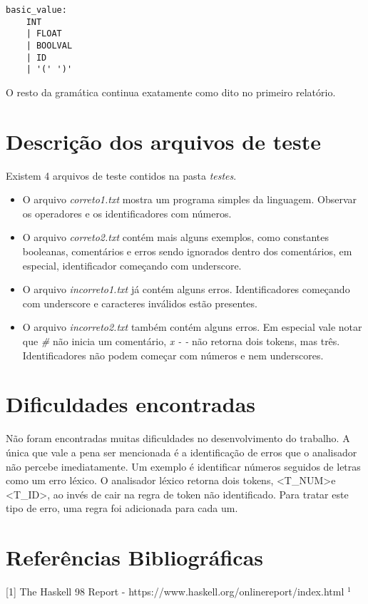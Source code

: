 \documentclass[11pt]{article}
\begin{document}
\begin{lstlisting}[basicstyle=\small]
basic_value: 
    INT
    | FLOAT
    | BOOLVAL
    | ID
    | '(' ')'
\end{lstlisting}

O resto da gramática continua exatamente como dito no primeiro relatório.

\section{Descrição dos arquivos de teste}

Existem 4 arquivos de teste contidos na pasta \emph{testes}.
\begin{itemize}
    \item O arquivo \emph{correto1.txt} mostra um programa simples da linguagem. Observar os operadores e os identificadores com números.
    \item O arquivo \emph{correto2.txt} contém mais alguns exemplos, como constantes booleanas, comentários e erros sendo ignorados dentro dos comentários, 
        em especial, identificador começando com underscore.
    \item O arquivo \emph{incorreto1.txt} já contém alguns erros. Identificadores começando com underscore e caracteres inválidos estão presentes.
    \item O arquivo \emph{incorreto2.txt} também contém alguns erros. Em especial vale notar que \emph{\#} não inicia um comentário,
        \emph{x - -} não retorna dois tokens, mas três. Identificadores não podem começar com números e nem underscores.
\end{itemize}

\section{Dificuldades encontradas}

Não foram encontradas muitas dificuldades no desenvolvimento do trabalho. A única que vale a pena
ser mencionada é a identificação de erros que o analisador não percebe imediatamente.
Um exemplo é identificar números seguidos de letras como um erro léxico. O analisador léxico retorna dois tokens,
\textless T\_NUM\textgreater e \textless T\_ID\textgreater, ao invés de cair na regra de token não identificado. Para tratar este tipo de erro, uma regra foi
adicionada para cada um.

\section{Referências Bibliográficas}
[1] The Haskell 98 Report - https://www.haskell.org/onlinereport/index.html $^1$
\end{document}
